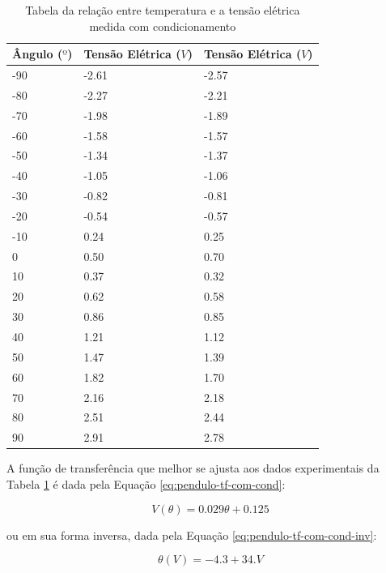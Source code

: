 \documentclass[a4paper]{instrumentacao}
\begin{document}
\begin{table}[H]
\centering
\caption{Tabela da relação entre temperatura e a tensão elétrica medida com condicionamento}
\begin{tabular}{|l|l|l|}
 \hline
 \textbf{Ângulo ($º$)} & \textbf{Tensão Elétrica ($V$)} & \textbf{Tensão Elétrica ($V$)} \\ \hline

 -90 & -2.61 & -2.57 	\\ \hline
 -80 & -2.27 & -2.21 	\\ \hline
 -70 & -1.98 & -1.89 	\\ \hline
 -60 & -1.58 & -1.57 	\\ \hline
 -50 & -1.34 & -1.37 	\\ \hline
 -40 & -1.05 & -1.06 	\\ \hline
 -30 & -0.82 & -0.81 	\\ \hline
 -20 & -0.54 & -0.57 	\\ \hline
 -10 & 0.24 & 0.25 		\\ \hline
 0 & 0.50 & 0.70 		\\ \hline
 10 & 0.37 & 0.32 		\\ \hline
 20 & 0.62 & 0.58 		\\ \hline
 30 & 0.86 & 0.85 		\\ \hline
 40 & 1.21 & 1.12 		\\ \hline
 50 & 1.47 & 1.39 		\\ \hline
 60 & 1.82 & 1.70 		\\ \hline
 70 & 2.16 & 2.18 		\\ \hline
 80 & 2.51 & 2.44 		\\ \hline
 90 & 2.91 & 2.78 		\\ \hline

\end{tabular}
\label{tab:pendulo-calibracao-condicionado}
\end{table}

A função de transferência que melhor se ajusta aos dados experimentais da Tabela \ref{tab:pendulo-calibracao-condicionado} é dada pela Equação \ref{eq:pendulo-tf-com-cond}:

\begin{equation}
	V(\theta) = 0.029 \theta + 0.125
	\label{eq:pendulo-tf-com-cond}
\end{equation}

\noindent 
ou em sua forma inversa, dada pela Equação \ref{eq:pendulo-tf-com-cond-inv}:

\begin{equation}
	\theta(V) = -4.3 + 34. V
	\label{eq:pendulo-tf-com-cond-inv}
\end{equation}
\end{document}

